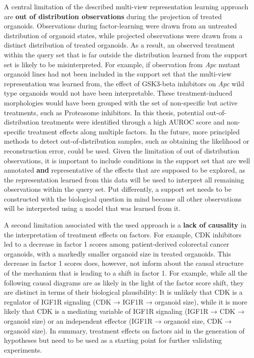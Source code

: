 \begin{flushleft}
A central limitation of the described multi-view representation learning approach are \textbf{out of distribution observations} during the projection of treated organoids. Observations during factor-learning were drawn from an untreated distribution of organoid states, while projected observations were drawn from a distinct distribution of treated organoids. As a result, an observed treatment within the query set that is far outside the distribution learned from the support set is likely to be misinterpreted. For example, if observation from \textit{Apc} mutant organoid lines had not been included in the support set that the multi-view representation was learned from, the effect of GSK3-beta inhibitors on \textit{Apc} wild type organoids would not have been interpretable. These treatment-induced morphologies would have been grouped with the set of non-specific but active treatments, such as Proteasome inhibitors. In this thesis, potential out-of-distribution treatments were identified through a high AUROC score and non-specific treatment effects along multiple factors. In the future, more principled methods to detect out-of-distribution samples, such as obtaining the likelihood or reconstruction error, could be used. Given the limitation of out of distribution observations, it is important to include conditions in the support set that are well annotated \textbf{and} representative of the effects that are supposed to be explored, as the representation learned from this data will be used to interpret all remaining observations within the query set. Put differently, a support set needs to be constructed with the biological question in mind because all other observations will be interpreted using a model that was learned from it.
\smallbreak

A second limitation associated with the used approach is a \textbf{lack of causality} in the interpretation of treatment effects on factors. For example, CDK inhibitors led to a decrease in factor 1 scores among patient-derived colorectal cancer organoids, with a markedly smaller organoid size in treated organoids. This decrease in factor 1 scores does, however, not inform about the causal structure of the mechanism that is leading to a shift in factor 1. For example, while all the following causal diagrams are as likely in the light of the factor score shift, they are distinct in terms of their biological plausibility: It is unlikely that CDK is a regulator of IGF1R signaling (CDK → IGF1R → organoid size), while it is more likely that CDK is a mediating variable of IGF1R signaling (IGF1R → CDK → organoid size) or an independent effector (IGF1R → organoid size, CDK → organoid size). In summary, treatment effects on factors aid in the generation of hypotheses but need to be used as a starting point for further validating experiments.
\smallbreak


\end{flushleft}

